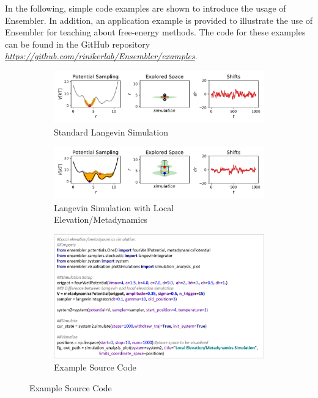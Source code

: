 In the following, simple code examples are shown to introduce the usage of Ensembler. In addition, an application example is provided to illustrate the use of Ensembler for teaching about free-energy methods. 
The code for these examples can be found in the GitHub repository \textit{\hyperlink{https://github.com/rinikerlab/Ensembler}{https://github.com/rinikerlab/Ensembler/examples}}.

\begin{figure}
	\centering
	\begin{subfigure}{\textwidth}
		\caption{Standard Langevin Simulation}
		\centering
		\includegraphics[width=0.85\linewidth]{fig/codeExamples/langevin_simulation.pdf} 
	\end{subfigure}
	\vspace{2.5mm}
	\begin{subfigure}{\textwidth}
		\caption{Langevin Simulation with Local Elevation/Metadynamics}
		\centering
		\includegraphics[width=0.85\linewidth]{fig/codeExamples/metaDynamics_simulation.pdf}
	\end{subfigure}
	\vspace{2.5mm}
	\begin{subfigure}{\textwidth}
		\caption{Example Source Code}
		\centering
		\includegraphics[width=0.85\linewidth]{fig/codeExamples/Simulation_code.png}

\end{subfigure}
\end{figure}
